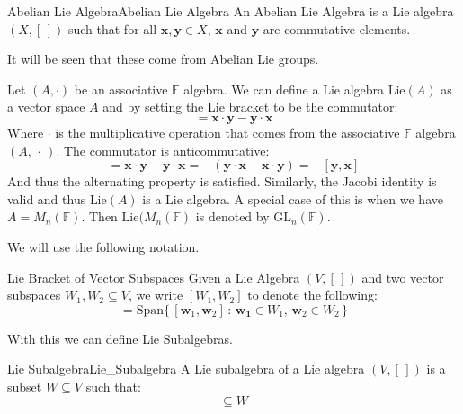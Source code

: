     \begin{fdefinition}{Abelian Lie Algebra}{Abelian Lie Algebra}
        An Abelian Lie Algebra is a Lie algebra $(X,[\,])$ such that for
        all $\mathbf{x},\mathbf{y}\in{X}$, $\mathbf{x}$ and $\mathbf{y}$
        are commutative elements.
    \end{fdefinition}
    It will be seen that these come from Abelian Lie groups.
    \begin{lexample}{}{}
        Let $(A,\cdot)$ be an associative $\mathbb{F}$ algebra. We can
        define a Lie algebra $\textrm{Lie}(A)$ as a vector space
        $A$ and by setting the Lie bracket to be the commutator:
        \begin{equation}
            [\mathbf{x},\mathbf{y}]
            =\mathbf{x}\cdot\mathbf{y}-\mathbf{y}\cdot\mathbf{x}
        \end{equation}
        Where $\cdot$ is the multiplicative operation that comes from the
        associative $\mathbb{F}$ algebra $(A,\,\cdot\,)$.
        The commutator is anticommutative:
        \begin{equation}
            [\mathbf{x},\mathbf{y}]
            =\mathbf{x}\cdot\mathbf{y}-\mathbf{y}\cdot\mathbf{x}
            =\minus(\mathbf{y}\cdot\mathbf{x}-\mathbf{x}\cdot\mathbf{y})
            =\minus[\mathbf{y},\mathbf{x}]
        \end{equation}
        And thus the alternating property is satisfied. Similarly, the
        Jacobi identity is valid and thus $\textrm{Lie}(A)$ is a Lie
        algebra. A special case of this is when we have
        $A=M_{n}(\mathbb{F})$. Then $\textrm{Lie}(M_{n}(\mathbb{F})$ is
        denoted by $\textrm{GL}_{n}(\mathbb{F})$.
    \end{lexample}
    We will use the following notation.
    \begin{fnotation}{Lie Bracket of Vector Subspaces}{}
        Given a Lie Algebra $(V,[\,])$ and two vector subspaces
        $W_{1},W_{2}\subseteq{V}$, we write $[W_{1},W_{2}]$ to
        denote the following:
        \begin{equation}
            [W_{1},W_{2}]=\textrm{Span}\big\{\,
            [\mathbf{w}_{1},\mathbf{w}_{2}]\,:\,
                \mathbf{w_{1}}\in{W}_{1},\,\mathbf{w}_{2}\in{W}_{2}\,\big\}
        \end{equation}
    \end{fnotation}
    With this we can define Lie Subalgebras.
    \begin{fdefinition}{Lie Subalgebra}{Lie_Subalgebra}
        A Lie subalgebra of a Lie algebra $(V,[\,])$ is a subset
        $W\subseteq{V}$ such that:
        \begin{equation}
            [W,W]\subseteq{W}
        \end{equation}
    \end{fdefinition}
